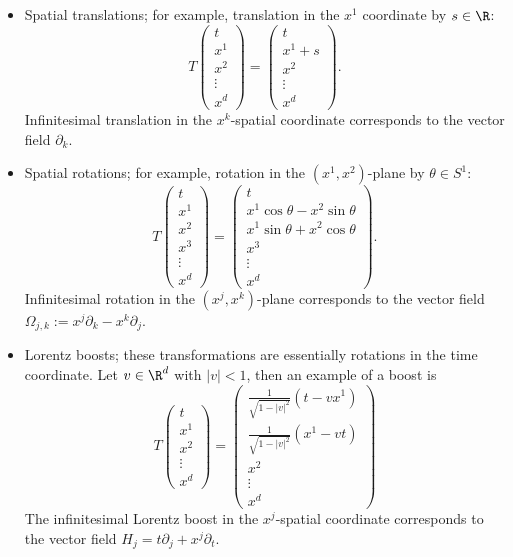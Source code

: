 \begin{itemize}
	\item Spatial translations; for example, translation in the $x^1$ coordinate by $s \in \R$:
				\[ T\begin{pmatrix} t \\ x^1 \\ x^2\\ \vdots \\ x^d \end{pmatrix} =  \begin{pmatrix} t \\ x^1 + s \\ x^2 \\ \vdots  \\ x^d \end{pmatrix}.\]
			Infinitesimal translation in the $x^k$-spatial coordinate corresponds to the vector field $\partial_k$. 	
	
	\item Spatial rotations; for example, rotation in the $(x^1, x^2)$-plane by $\theta \in S^1$:
				\[
					T \begin{pmatrix} t \\ x^1 \\ x^2 \\ x^3 \\ \vdots \\ x^d \end{pmatrix}
					=
					\begin{pmatrix} t \\ x^1 \cos \theta  -x^2 \sin \theta  \\ x^1 \sin \theta  +  x^2 \cos \theta  \\  x^3 \\ \vdots \\ x^d \end{pmatrix}.
				\]
			Infinitesimal rotation in the $(x^j, x^k)$-plane corresponds to the vector field $\Omega_{j, k} := x^j \partial_k - x^k \partial_j$. 
	
	\item Lorentz boosts; these transformations are essentially rotations in the time coordinate. Let $v \in \R^d$ with $|v| < 1$, then an example of a boost is
				\[
					T
					\begin{pmatrix} t \\ x^1 \\ x^2 \\ \vdots \\ x^d \end{pmatrix}
					 = \begin{pmatrix} \frac{1}{\sqrt{1 - |v|^2}} (t - v x^1) \\  \frac{1}{\sqrt{1 - |v|^2}} (x^1 - v t) \\ x^2 \\ \vdots \\ x^d \end{pmatrix}
				 \]
			The infinitesimal Lorentz boost in the $x^j$-spatial coordinate corresponds to the vector field $H_j = t \partial_j + x^j \partial_t$. 	 
\end{itemize}
